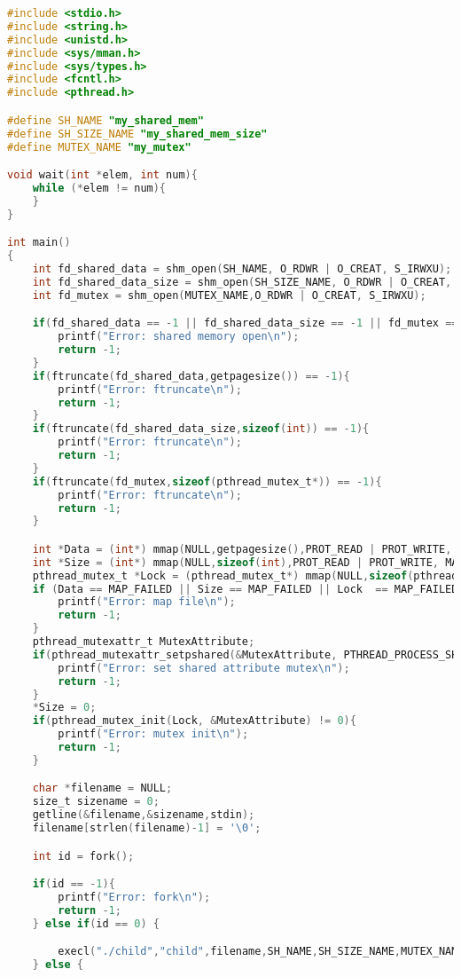 \documentclass[pdf, unicode, 12pt, a4paper,oneside,fleqn]{article}
\begin{document}
\begin{lstlisting}[language=C]
#include <stdio.h>
#include <string.h>
#include <unistd.h>
#include <sys/mman.h>
#include <sys/types.h>
#include <fcntl.h>
#include <pthread.h>

#define SH_NAME "my_shared_mem"
#define SH_SIZE_NAME "my_shared_mem_size"
#define MUTEX_NAME "my_mutex"

void wait(int *elem, int num){
    while (*elem != num){
    }
}

int main()
{
    int fd_shared_data = shm_open(SH_NAME, O_RDWR | O_CREAT, S_IRWXU);
    int fd_shared_data_size = shm_open(SH_SIZE_NAME, O_RDWR | O_CREAT, S_IRWXU);
    int fd_mutex = shm_open(MUTEX_NAME,O_RDWR | O_CREAT, S_IRWXU);

    if(fd_shared_data == -1 || fd_shared_data_size == -1 || fd_mutex == -1){
        printf("Error: shared memory open\n");
        return -1;
    }
    if(ftruncate(fd_shared_data,getpagesize()) == -1){
        printf("Error: ftruncate\n");
        return -1;
    }
    if(ftruncate(fd_shared_data_size,sizeof(int)) == -1){
        printf("Error: ftruncate\n");
        return -1;
    }
    if(ftruncate(fd_mutex,sizeof(pthread_mutex_t*)) == -1){
        printf("Error: ftruncate\n");
        return -1;
    }

    int *Data = (int*) mmap(NULL,getpagesize(),PROT_READ | PROT_WRITE, MAP_SHARED, fd_shared_data, 0);
    int *Size = (int*) mmap(NULL,sizeof(int),PROT_READ | PROT_WRITE, MAP_SHARED, fd_shared_data_size, 0);
    pthread_mutex_t *Lock = (pthread_mutex_t*) mmap(NULL,sizeof(pthread_mutex_t*),PROT_READ | PROT_WRITE, MAP_SHARED,fd_mutex,0);
    if (Data == MAP_FAILED || Size == MAP_FAILED || Lock  == MAP_FAILED) {
        printf("Error: map file\n");
        return -1;
    }
    pthread_mutexattr_t MutexAttribute;
    if(pthread_mutexattr_setpshared(&MutexAttribute, PTHREAD_PROCESS_SHARED) != 0){
        printf("Error: set shared attribute mutex\n");
        return -1;
    }
    *Size = 0;
    if(pthread_mutex_init(Lock, &MutexAttribute) != 0){
        printf("Error: mutex init\n");
        return -1;
    }    

    char *filename = NULL;
    size_t sizename = 0;
    getline(&filename,&sizename,stdin);
    filename[strlen(filename)-1] = '\0';

    int id = fork();

    if(id == -1){
        printf("Error: fork\n");
        return -1;
    } else if(id == 0) {

        execl("./child","child",filename,SH_NAME,SH_SIZE_NAME,MUTEX_NAME,(char*) NULL);
    } else {


\end{lstlisting}
\end{document}
